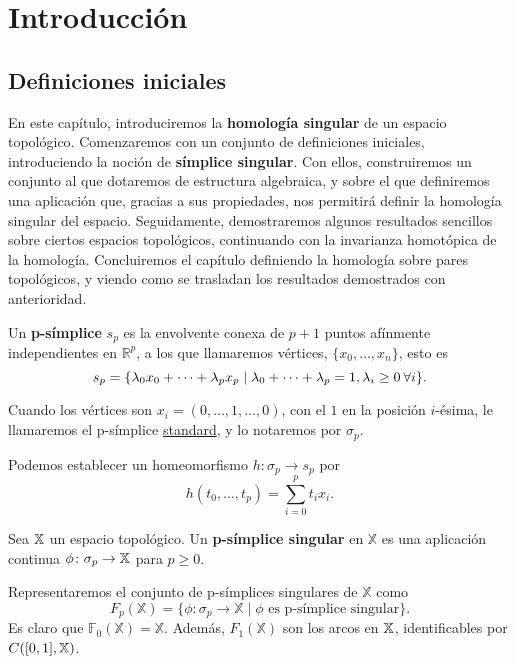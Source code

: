 \chapter{Introducción}\label{ch:introduccion}

\section{Definiciones iniciales}

En este capítulo, introduciremos la \textbf{homología singular} de un espacio topológico. Comenzaremos con
un conjunto de definiciones iniciales, introduciendo la noción de \textbf{símplice singular}. Con ellos,
construiremos un conjunto al que dotaremos de estructura algebraica, y sobre el que definiremos una aplicación
que, gracias a sus propiedades, nos permitirá definir la homología singular del espacio. Seguidamente,
demostraremos algunos resultados sencillos sobre ciertos espacios topológicos, continuando con la invarianza
homotópica de la homología. Concluiremos el capítulo definiendo la homología sobre pares topológicos, y
viendo como se trasladan los resultados demostrados con anterioridad. \citep{vick:1973}

\begin{definition}
Un \textbf{p-símplice} $s_p$ es la envolvente conexa de $p+1$ puntos afínmente independientes en $\mathbb{R}^p$,
a los que llamaremos vértices, $\{x_0, \dots, x_n\}$, esto es
\[ s_p = \{\lambda_0 x_0 + \dots + \lambda_p x_p \mid \lambda_0 + \dots + \lambda_p = 1, \lambda_i \geq 0 \hspace{0.2em} \forall i \}. \]
\end{definition}
Cuando los vértices son $x_i = (0, \dots, 1, \dots, 0)$, con el $1$ en la posición $i$-ésima, le llamaremos el p-símplice \underline{standard},
y lo notaremos por $\sigma_p$.

Podemos establecer un homeomorfismo $h \colon \sigma_p \to s_p$ por
\[ h(t_0, \dots, t_p) = \sum\limits_{i = 0}^p t_i x_i. \]

\begin{definition}
Sea ${\mathbb X}$ un espacio topológico. Un \textbf{p-símplice singular} en $\mathbb{X}$ es una aplicación continua $\phi \colon \sigma_p \to {\mathbb X}$ para $p \geq 0$.
\end{definition}

Representaremos el conjunto de p-símplices singulares de $\mathbb{X}$ como
\[F_p(\mathbb{X}) = \{\phi \colon \sigma_p \to \mathbb{X} \mid \phi \text{ es p-símplice singular}\}.\]
Es claro que $\mathbb{F}_0(\mathbb{X}) = \mathbb{X}$. Además, $F_1(\mathbb{X})$ son los arcos en ${\mathbb X}$, identificables por
$\mathbb \mathcal{C}([0,1], {\mathbb X})$.

